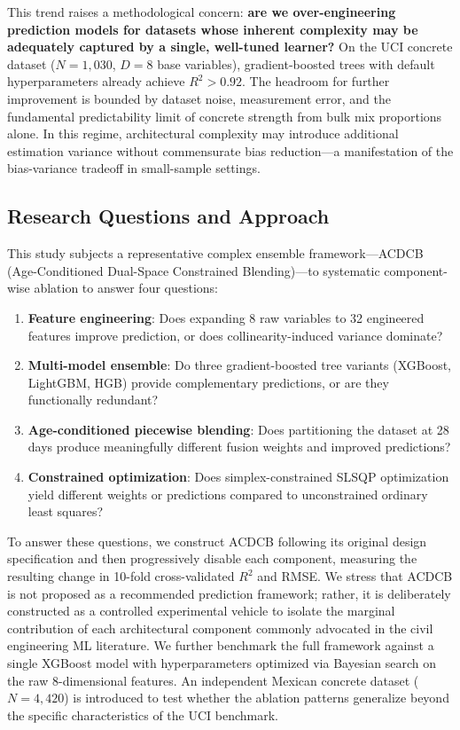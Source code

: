 \documentclass[journal]{IEEEtran}
\begin{document}
This trend raises a methodological concern: \textbf{are we over-engineering prediction models for datasets whose inherent complexity may be adequately captured by a single, well-tuned learner?} On the UCI concrete dataset ($N = 1{,}030$, $D = 8$ base variables), gradient-boosted trees with default hyperparameters already achieve $R^2 > 0.92$. The headroom for further improvement is bounded by dataset noise, measurement error, and the fundamental predictability limit of concrete strength from bulk mix proportions alone. In this regime, architectural complexity may introduce additional estimation variance without commensurate bias reduction---a manifestation of the bias-variance tradeoff in small-sample settings.

\subsection{Research Questions and Approach}

This study subjects a representative complex ensemble framework---ACDCB (Age-Conditioned Dual-Space Constrained Blending)---to systematic component-wise ablation to answer four questions:

\begin{enumerate}
\item \textbf{Feature engineering}: Does expanding 8 raw variables to 32 engineered features improve prediction, or does collinearity-induced variance dominate?
\item \textbf{Multi-model ensemble}: Do three gradient-boosted tree variants (XGBoost, LightGBM, HGB) provide complementary predictions, or are they functionally redundant?
\item \textbf{Age-conditioned piecewise blending}: Does partitioning the dataset at 28 days produce meaningfully different fusion weights and improved predictions?
\item \textbf{Constrained optimization}: Does simplex-constrained SLSQP optimization yield different weights or predictions compared to unconstrained ordinary least squares?
\end{enumerate}

To answer these questions, we construct ACDCB following its original design specification and then progressively disable each component, measuring the resulting change in 10-fold cross-validated $R^2$ and RMSE. We stress that ACDCB is not proposed as a recommended prediction framework; rather, it is deliberately constructed as a controlled experimental vehicle to isolate the marginal contribution of each architectural component commonly advocated in the civil engineering ML literature. We further benchmark the full framework against a single XGBoost model with hyperparameters optimized via Bayesian search on the raw 8-dimensional features. An independent Mexican concrete dataset ($N = 4{,}420$) is introduced to test whether the ablation patterns generalize beyond the specific characteristics of the UCI benchmark.
\end{document}
